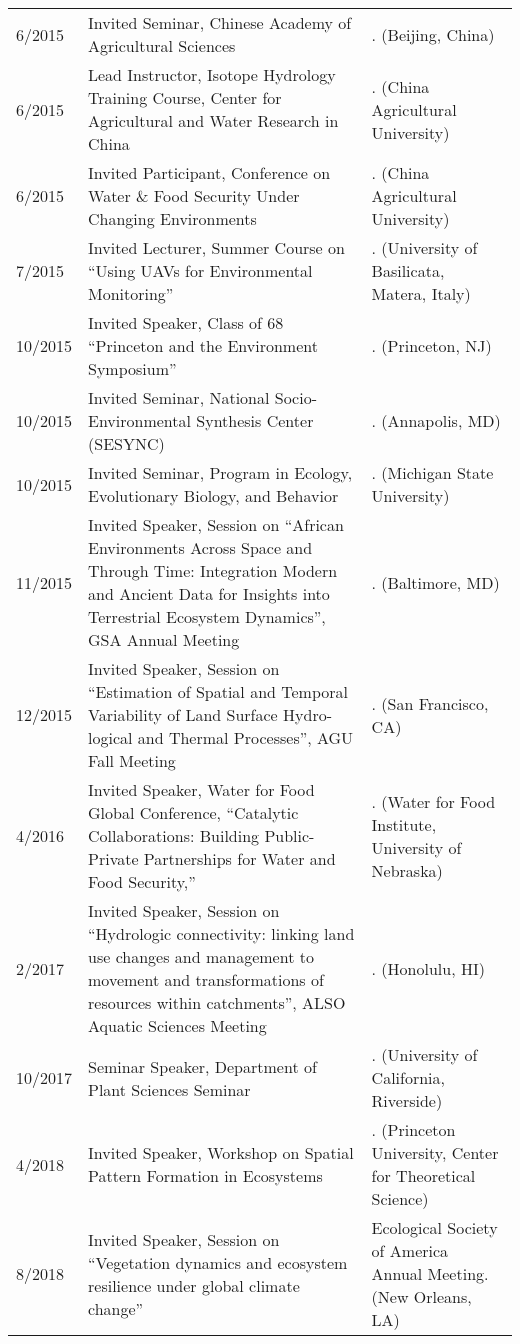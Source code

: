 \begin{longtable}{lp{7.0cm}p{6.5cm}}
6/2015 & Invited Seminar, Chinese Academy of Agricultural Sciences & . (Beijing, China) \\
6/2015 & Lead Instructor, Isotope Hydrology Training Course, Center for Agricultural and Water Research in China & . (China Agricultural University) \\
6/2015 & Invited Participant, Conference on Water \& Food Security Under Changing Environments & . (China Agricultural University) \\
7/2015 & Invited Lecturer, Summer Course on ``Using UAVs for Environmental Monitoring'' & . (University of Basilicata, Matera, Italy) \\
10/2015 & Invited Speaker, Class of 68 ``Princeton and the Environment Symposium'' & . (Princeton, NJ) \\
10/2015 & Invited Seminar, National Socio-Environmental Synthesis Center (SESYNC) & . (Annapolis, MD) \\
10/2015 & Invited Seminar, Program in Ecology, Evolutionary Biology, and Behavior & . (Michigan State University) \\
11/2015 & Invited Speaker, Session on ``African Environments Across Space and Through Time: Integration Modern and Ancient Data for Insights into Terrestrial Ecosystem Dynamics'', GSA Annual Meeting & . (Baltimore, MD) \\
12/2015 & Invited Speaker, Session on ``Estimation of Spatial and Temporal Variability of Land Surface Hydro- logical and Thermal Processes'', AGU Fall Meeting & . (San Francisco, CA) \\
4/2016 & Invited Speaker, Water for Food Global Conference, ``Catalytic Collaborations: Building Public- Private Partnerships for Water and Food Security,''  & . (Water for Food Institute, University of Nebraska) \\
2/2017 & Invited Speaker, Session on ``Hydrologic connectivity: linking land use changes and management to movement and transformations of resources within catchments'', ALSO Aquatic Sciences Meeting & . (Honolulu, HI) \\
10/2017 & Seminar Speaker, Department of Plant Sciences Seminar & . (University of California, Riverside) \\
4/2018 & Invited Speaker, Workshop on Spatial Pattern Formation in Ecosystems & . (Princeton University, Center for Theoretical Science) \\
8/2018 & Invited Speaker, Session on ``Vegetation dynamics and ecosystem resilience under global climate change'' &  Ecological Society of America Annual Meeting. (New Orleans, LA) \\

\end{longtable}
